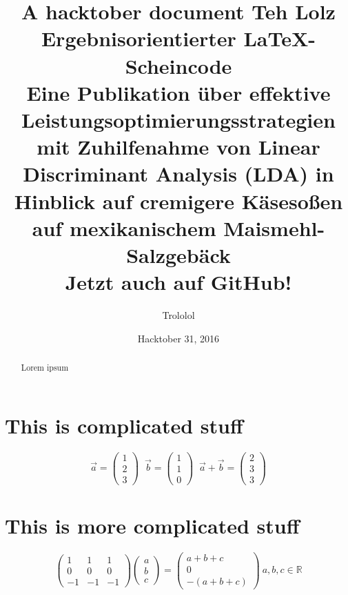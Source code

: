 \documentclass{article}
\title{A hacktober document}
\author{Trololol}
\date{Hacktober 31, 2016}
\title{
    Teh Lolz\\
  \vspace{7mm}
    Ergebnisorientierter {\LaTeX}-Scheincode\\
  \vspace{5mm}
  \small {
    	Eine Publikation \"uber effektive Leistungsoptimierungsstrategien mit Zuhilfenahme von Linear Discriminant Analysis (LDA) in Hinblick auf cremigere K\"aseso\ss{}en auf mexikanischem Maismehl-Salzgeb\"ack\\
    }
  \vspace{1cm}
  \large {
        Jetzt auch auf GitHub!\\
      \vspace{1cm}
    }
}
\begin{document}
	\maketitle

	\thispagestyle{empty}
	\begin{abstract}
		Lorem ipsum
	\end{abstract}

	\newpage

	\section{This is complicated stuff}
	\begin{equation*}
		\vec{a} =
		\begin{pmatrix}
		1 \\
		2 \\
		3
		\end{pmatrix}\;\;
		\vec{b} =
		\begin{pmatrix}
		1 \\
		1 \\
		0
		\end{pmatrix}\;\;
		\vec{a} + \vec{b} = \begin{pmatrix}
		2 \\
		3 \\
		3
		\end{pmatrix}
	\end{equation*}

	\newpage

	\section{This is more complicated stuff}
	\begin{equation}
		\begin{pmatrix}
		1 & 1 & 1 \\
		0 & 0 & 0 \\
		-1 & -1 & -1
		\end{pmatrix}
		\begin{pmatrix}
		a \\
		b \\
		c
		\end{pmatrix} =
		\begin{pmatrix}
		a + b + c \\
		0 \\
		-(a + b + c)
		\end{pmatrix} \>
		a, b, c \in \mathbb{R}
	\end{equation}
\end{document}
